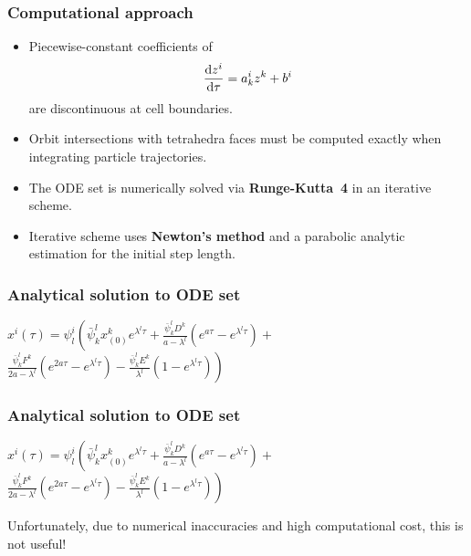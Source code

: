 \documentclass{beamer}
\newcommand{\rd}{{\rm d}}
\begin{document}
\begin{frame}
\frametitle{Computational approach}
\vspace{-0.5cm}
\begin{itemize}
	\item Piecewise-constant coefficients of 
	$$
	\frac{\rd z^i}{\rd \tau} = a^i_k z^k + b^i
	$$
	are discontinuous at cell boundaries. 
	\item Orbit intersections with tetrahedra faces must be computed exactly when integrating particle trajectories.
	
	\item The ODE set is numerically solved via \textbf{Runge-Kutta~4} in an iterative scheme.
	\item Iterative scheme uses \textbf{Newton's method} and a parabolic analytic estimation for the  initial step length.

\end{itemize}
\end{frame}

\begin{frame}
\frametitle{Analytical solution to ODE set}
\vspace{0cm}
$x^i(\tau) =   \psi^i_l  \left(\bar{\psi}^l_k x^k_{(0)}e^{\lambda^l \tau} + \frac{\bar{\psi}^l_k D^k}{a-\lambda^l}(e^{a\tau}-e^{\lambda^l\tau}) + \right.$\\
\vspace{0.5cm}
\hspace{1.5cm}$\left. \frac{\bar{\psi}^l_k F^k}{2a-\lambda^l}(e^{2a\tau}-e^{\lambda^l\tau})-\frac{\bar{\psi}^l_k E^k}{\lambda^l}(1-e^{\lambda^l\tau}) \right)$
\end{frame}

\begin{frame}
\frametitle{Analytical solution to ODE set}
\vspace{0cm}
$x^i(\tau) =   \psi^i_l  \left(\bar{\psi}^l_k x^k_{(0)}e^{\lambda^l \tau} + \frac{\bar{\psi}^l_k D^k}{a-\lambda^l}(e^{a\tau}-e^{\lambda^l\tau}) + \right.$\\
\vspace{0.5cm}
\hspace{1.5cm}$\left. \frac{\bar{\psi}^l_k F^k}{2a-\lambda^l}(e^{2a\tau}-e^{\lambda^l\tau})-\frac{\bar{\psi}^l_k E^k}{\lambda^l}(1-e^{\lambda^l\tau}) \right)$
\vspace{1cm}

Unfortunately, due to numerical inaccuracies and high computational cost, this is not useful!
\end{frame}
\end{document}
